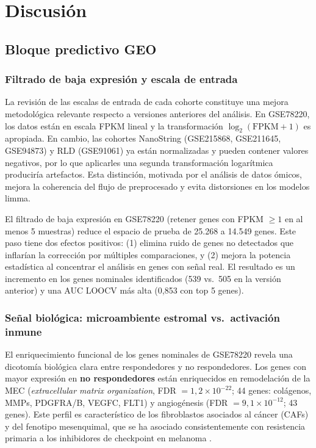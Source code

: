 \chapter{Discusión}

\section{Bloque predictivo GEO}

\subsection{Filtrado de baja expresión y escala de entrada}

La revisión de las escalas de entrada de cada cohorte constituye una mejora metodológica relevante respecto a versiones anteriores del análisis. En GSE78220, los datos están en escala FPKM lineal y la transformación $\log_2(\text{FPKM}+1)$ es apropiada. En cambio, las cohortes NanoString (GSE215868, GSE211645, GSE94873) y RLD (GSE91061) ya están normalizadas y pueden contener valores negativos, por lo que aplicarles una segunda transformación logarítmica produciría artefactos. Esta distinción, motivada por el análisis de datos ómicos, mejora la coherencia del flujo de preprocesado y evita distorsiones en los modelos limma.

El filtrado de baja expresión en GSE78220 (retener genes con FPKM $\geq 1$ en al menos 5 muestras) reduce el espacio de prueba de 25.268 a 14.549 genes. Este paso tiene dos efectos positivos: (1) elimina ruido de genes no detectados que inflarían la corrección por múltiples comparaciones, y (2) mejora la potencia estadística al concentrar el análisis en genes con señal real. El resultado es un incremento en los genes nominales identificados (539 vs.\ 505 en la versión anterior) y una AUC LOOCV más alta (0{,}853 con top 5 genes).

\subsection{Señal biológica: microambiente estromal vs.\ activación inmune}

El enriquecimiento funcional de los genes nominales de GSE78220 revela una dicotomía biológica clara entre respondedores y no respondedores. Los genes con mayor expresión en \textbf{no respondedores} están enriquecidos en remodelación de la MEC (\textit{extracellular matrix organization}, FDR $= 1{,}2\times10^{-22}$; 44 genes: colágenos, MMPs, PDGFRA/B, VEGFC, FLT1) y angiogénesis (FDR $= 9{,}1\times10^{-12}$; 43 genes). Este perfil es característico de los fibroblastos asociados al cáncer (CAFs) y del fenotipo mesenquimal, que se ha asociado consistentemente con resistencia primaria a los inhibidores de checkpoint en melanoma \cite{Kim2022, Dempke2017}.

